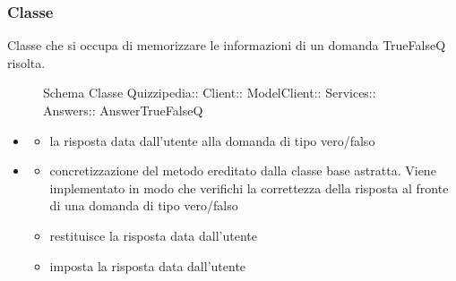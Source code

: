 \subsubsection{Classe }
Classe che si occupa di memorizzare le informazioni di un domanda TrueFalseQ risolta.
\begin{figure}[H]
\centering
\noindent{}
\caption[Schema Classe AnswerTrueFalseQ]{Schema Classe Quizzipedia:: Client:: ModelClient:: Services:: Answers:: AnswerTrueFalseQ}
\end{figure}
\begin{itemize}
\item {}
\begin{itemize}
\item {}
\newline
la risposta data dall'utente alla domanda di tipo vero/falso
\end{itemize}
\item {}
\begin{itemize}
\item {}
\newline
concretizzazione del metodo ereditato dalla classe base astratta. Viene implementato in modo che verifichi la correttezza della risposta al fronte di una domanda di tipo vero/falso
\newline
\item {}
\newline
restituisce la risposta data dall'utente
\newline
\item {}
\newline
imposta la risposta data dall'utente
\newline
\end{itemize}
\end{itemize}
